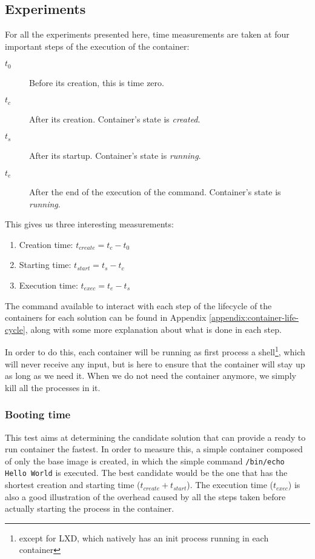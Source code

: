 \subsection{Experiments} \label{subs:experiments}
For all the experiments presented here, time measurements are taken at four important steps of the execution of the container:
\begin{description}
  \item[$t_0$] Before its creation, this is time zero.
  \item[$t_c$] After its creation. Container's state is \textit{created}.
  \item[$t_s$] After its startup. Container's state is \textit{running}.
  \item[$t_e$] After the end of the execution of the command. Container's state is \textit{running}.
\end{description}
This gives us three interesting measurements:
\begin{enumerate}
  \item Creation time: $t_{create}=t_c - t_0$
  \item Starting time: $t_{start}=t_s - t_c$
  \item Execution time: $t_{exec}=t_e - t_s$
\end{enumerate}

The command available to interact with each step of the lifecycle of the containers for each solution can be found in Appendix \ref{appendix:container-life-cycle}, along with some more explanation about what is done in each step.

In order to do this, each container will be running as first process a shell\footnote{except for LXD, which natively has an init process running in each container}, which will never receive any input, but is here to ensure that the container will stay up as long as we need it.  When we do not need the container anymore, we simply kill all the processes in it.

\subsubsection{Booting time}
This test aims at determining the candidate solution that can provide a ready to run container the fastest.  In order to measure this, a simple container composed of only the base image is created, in which the simple command \texttt{/bin/echo Hello World} is executed.  The best candidate would be the one that has the shortest creation and starting time ($t_{create} + t_{start}$).  The execution time ($t_{exec}$) is also a good illustration of the overhead caused by all the steps taken before actually starting the process in the container.

